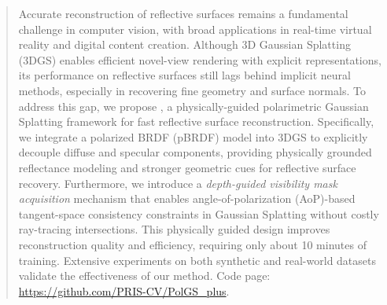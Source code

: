 
\begin{abstract}
	Accurate reconstruction of reflective surfaces remains a fundamental challenge in computer vision, with broad applications in real-time virtual reality and digital content creation. Although 3D Gaussian Splatting (3DGS) enables efficient novel-view rendering with explicit representations, its performance on reflective surfaces still lags behind implicit neural methods, especially in recovering fine geometry and surface normals. To address this gap, we propose \polgs, a physically-guided polarimetric Gaussian Splatting framework for fast reflective surface reconstruction. Specifically, we integrate a polarized BRDF (pBRDF) model into 3DGS to explicitly decouple diffuse and specular components, providing physically grounded reflectance modeling and stronger geometric cues for reflective surface recovery. 
	Furthermore, we introduce a \emph{depth-guided visibility mask acquisition} mechanism that enables angle-of-polarization (AoP)-based tangent-space consistency constraints in Gaussian Splatting without costly ray-tracing intersections. 
	This physically guided design improves reconstruction quality and efficiency, requiring only 	about 10 minutes of training. Extensive experiments on both synthetic and real-world datasets validate the 	effectiveness of our method.
Code page: \href{https://github.com/PRIS-CV/PolGS\_plus}{https://github.com/PRIS-CV/PolGS\_plus}.
\end{abstract}
\vspace{-2em}
